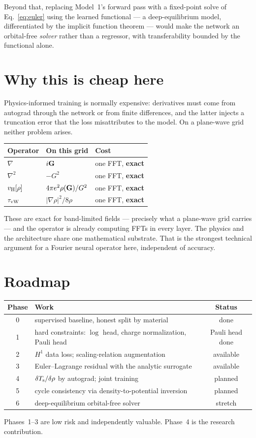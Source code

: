 Beyond that, replacing Model~1's forward pass with a fixed-point solve of
Eq.~\eqref{eq:euler} using the learned functional --- a deep-equilibrium model,
differentiated by the implicit function theorem --- would make the network an
orbital-free \emph{solver} rather than a regressor, with transferability bounded
by the functional alone.

\section{Why this is cheap here}

Physics-informed training is normally expensive: derivatives must come from
autograd through the network or from finite differences, and the latter injects
a truncation error that the loss misattributes to the model. On a plane-wave
grid neither problem arises.

\begin{center}
\begin{tabular}{@{}lll@{}}
\toprule
Operator & On this grid & Cost \\
\midrule
$\nabla$ & $i\mathbf{G}$ & one FFT, \textbf{exact} \\
$\nabla^2$ & $-G^2$ & one FFT, \textbf{exact} \\
$v_{\mathrm{H}}[\rho]$ & $4\pi e^2\rho(\mathbf{G})/G^2$ & one FFT, \textbf{exact} \\
$\tau_{\mathrm{vW}}$ & $|\nabla\rho|^2/8\rho$ & one FFT, \textbf{exact} \\
\bottomrule
\end{tabular}
\end{center}

These are exact for band-limited fields --- precisely what a plane-wave grid
carries --- and the operator is already computing FFTs in every layer. The
physics and the architecture share one mathematical substrate. That is the
strongest technical argument for a Fourier neural operator here, independent of
accuracy.

\section{Roadmap}

\begin{center}
\begin{tabular}{@{}clc@{}}
\toprule
Phase & Work & Status \\
\midrule
0 & supervised baseline, honest split by material & done \\
1 & hard constraints: $\log$ head, charge normalization, Pauli head & Pauli head done \\
2 & $H^1$ data loss; scaling-relation augmentation & available \\
3 & Euler--Lagrange residual with the analytic surrogate & available \\
4 & $\delta T_{\mathrm{s}}/\delta\rho$ by autograd; joint training & planned \\
5 & cycle consistency via density-to-potential inversion & planned \\
6 & deep-equilibrium orbital-free solver & stretch \\
\bottomrule
\end{tabular}
\end{center}

Phases~1--3 are low risk and independently valuable. Phase~4 is the research
contribution.
